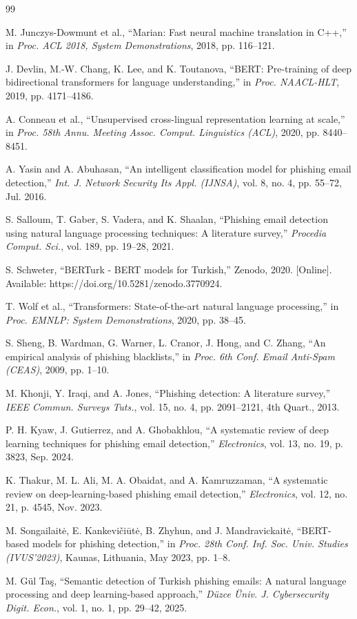 \documentclass[conference]{IEEEtran}
\begin{document}
\begin{thebibliography}{99}

 M. Junczys-Dowmunt et al., ``Marian: Fast neural machine translation in C++,'' in \emph{Proc. ACL 2018, System Demonstrations}, 2018, pp. 116--121.

 J. Devlin, M.-W. Chang, K. Lee, and K. Toutanova, ``BERT: Pre-training of deep bidirectional transformers for language understanding,'' in \emph{Proc. NAACL-HLT}, 2019, pp. 4171--4186.

 A. Conneau et al., ``Unsupervised cross-lingual representation learning at scale,'' in \emph{Proc. 58th Annu. Meeting Assoc. Comput. Linguistics (ACL)}, 2020, pp. 8440--8451.

 A. Yasin and A. Abuhasan, ``An intelligent classification model for phishing email detection,'' \emph{Int. J. Network Security Its Appl. (IJNSA)}, vol. 8, no. 4, pp. 55--72, Jul. 2016.

 S. Salloum, T. Gaber, S. Vadera, and K. Shaalan, ``Phishing email detection using natural language processing techniques: A literature survey,'' \emph{Procedia Comput. Sci.}, vol. 189, pp. 19--28, 2021.

 S. Schweter, ``BERTurk - BERT models for Turkish,'' Zenodo, 2020. [Online]. Available: https://doi.org/10.5281/zenodo.3770924.

 T. Wolf et al., ``Transformers: State-of-the-art natural language processing,'' in \emph{Proc. EMNLP: System Demonstrations}, 2020, pp. 38--45.

 S. Sheng, B. Wardman, G. Warner, L. Cranor, J. Hong, and C. Zhang, ``An empirical analysis of phishing blacklists,'' in \emph{Proc. 6th Conf. Email Anti-Spam (CEAS)}, 2009, pp. 1--10.

 M. Khonji, Y. Iraqi, and A. Jones, ``Phishing detection: A literature survey,'' \emph{IEEE Commun. Surveys Tuts.}, vol. 15, no. 4, pp. 2091--2121, 4th Quart., 2013.

 P. H. Kyaw, J. Gutierrez, and A. Ghobakhlou, ``A systematic review of deep learning techniques for phishing email detection,'' \emph{Electronics}, vol. 13, no. 19, p. 3823, Sep. 2024.

 K. Thakur, M. L. Ali, M. A. Obaidat, and A. Kamruzzaman, ``A systematic review on deep-learning-based phishing email detection,'' \emph{Electronics}, vol. 12, no. 21, p. 4545, Nov. 2023.

 M. Songailaitė, E. Kankevičiūtė, B. Zhyhun, and J. Mandravickaitė, ``BERT-based models for phishing detection,'' in \emph{Proc. 28th Conf. Inf. Soc. Univ. Studies (IVUS'2023)}, Kaunas, Lithuania, May 2023, pp. 1--8.

 M. Gül Taş, ``Semantic detection of Turkish phishing emails: A natural language processing and deep learning-based approach,'' \emph{Düzce Üniv. J. Cybersecurity Digit. Econ.}, vol. 1, no. 1, pp. 29--42, 2025.

\end{thebibliography}
\end{document}
